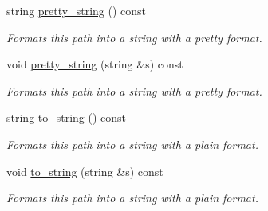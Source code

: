 \begin{DoxyCompactItemize}
string \hyperlink{classlgraph_1_1utils_1_1boolean__path_a3a562317b24dfc0abc3d8eb1e834eceb}{pretty\+\_\+string} () const 
\begin{DoxyCompactList}\small\item\em Formats this path into a string with a \textquotesingle{}pretty\textquotesingle{} format. \end{DoxyCompactList}\item 
void \hyperlink{classlgraph_1_1utils_1_1boolean__path_a772943b08c2cdca78583a2c539093db2}{pretty\+\_\+string} (string \&s) const 
\begin{DoxyCompactList}\small\item\em Formats this path into a string with a \textquotesingle{}pretty\textquotesingle{} format. \end{DoxyCompactList}\item 
string \hyperlink{classlgraph_1_1utils_1_1boolean__path_a3ca892df161835a80430d540ca883ab1}{to\+\_\+string} () const 
\begin{DoxyCompactList}\small\item\em Formats this path into a string with a plain format. \end{DoxyCompactList}\item 
void \hyperlink{classlgraph_1_1utils_1_1boolean__path_a86bbdb236fc31e2abd09f6029548b181}{to\+\_\+string} (string \&s) const 
\begin{DoxyCompactList}\small\item\em Formats this path into a string with a plain format. \end{DoxyCompactList}\end{DoxyCompactItemize}
